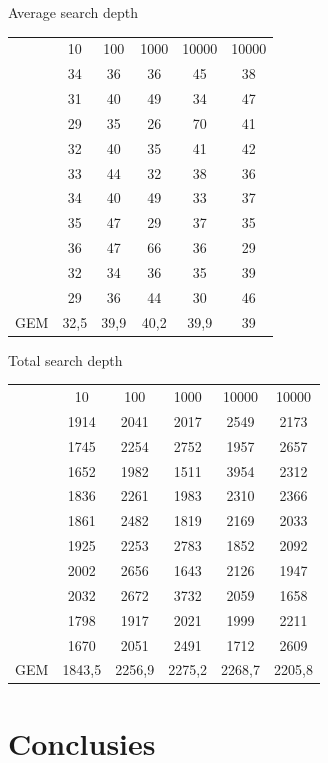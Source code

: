 \documentclass[a4paper,10pt]{article}
\begin{document}
Average search depth \\
\begin{center}
\begin{tabular}{c c c c c c}
 & 10 & 100 & 1000 & 10000 & 10000 \\
 & 34 & 36 & 36 & 45 & 38 \\
 & 31 & 40 & 49 & 34 & 47 \\
 & 29 & 	35 & 26 & 70 & 41 \\
 & 32 & 	40 & 35 & 41 & 42 \\
 & 33 & 	44 & 32 & 38 & 36 \\
 & 34 & 	40 & 49 & 33 & 37 \\
 & 35 & 	47 & 29 & 37 & 35 \\
 & 36 & 	47 & 66 & 36 & 29 \\
 & 32 & 	34 & 36 & 35 & 39 \\
 & 29 & 	36 & 44 & 30 & 46 \\
GEM & 32,5 & 39,9 & 40,2 & 39,9 & 39 \\
\end{tabular}
\end{center}
Total search depth \\
\begin{center}
\begin{tabular}{c c c c c c}
 & 10 & 100 & 1000 & 10000 & 10000 \\
 & 1914 & 2041 & 2017 & 2549 & 2173 \\
 & 1745 & 2254 & 2752 & 1957 & 2657 \\
 & 1652 & 1982 & 1511 & 3954 & 2312 \\
 & 1836 & 2261 & 1983 & 2310 & 2366 \\
 & 1861 & 2482 & 1819 & 2169 & 2033 \\
 & 1925 & 2253 & 2783 & 1852 & 2092 \\
 & 2002 & 2656 & 1643 & 2126 & 1947 \\
 & 2032 & 2672 & 3732 & 2059 & 1658 \\
 & 1798 & 1917 & 2021 & 1999 & 2211 \\
 & 1670 & 2051 & 2491 & 1712 & 2609 \\
GEM & 1843,5 & 2256,9 & 2275,2 & 2268,7 & 2205,8 \\
\end{tabular}
\end{center}

\section{Conclusies}
\end{document}
